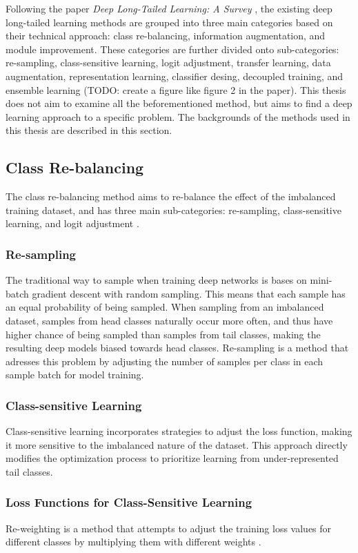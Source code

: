 Following the paper \textit{Deep Long-Tailed Learning: A Survey} \cite{zhang2023deep}, the existing deep long-tailed learning methods are grouped into three main categories based on their technical approach: class re-balancing, information augmentation, and module improvement. These categories are further divided onto sub-categories: re-sampling, class-sensitive learning, logit adjustment, transfer learning, data augmentation, representation learning, classifier desing, decoupled training, and ensemble learning (TODO: create a figure like figure 2 in the paper). This thesis does not aim to examine all the beforementioned method, but aims to find a deep learning approach to a specific problem. The backgrounds of the methods used in this thesis are described in this section.

\subsection{Class Re-balancing}
The class re-balancing method aims to re-balance the effect of the imbalanced training dataset, and has three main sub-categories: re-sampling, class-sensitive learning, and logit adjustment \cite{zhang2023deep}. 

\subsubsection{Re-sampling}
The traditional way to sample when training deep networks is bases on mini-batch gradient descent with random sampling. This means that each sample has an equal probability of being sampled. When sampling from an imbalanced dataset, samples from head classes naturally occur more often, and thus have higher chance of being sampled than samples from tail classes, making the resulting deep models biased towards head classes. Re-sampling is a method that adresses this problem by adjusting the number of samples per class in each sample batch for model training. 

\subsubsection{Class-sensitive Learning}
Class-sensitive learning incorporates strategies to adjust the loss function, making it more sensitive to the imbalanced nature of the dataset. This approach directly modifies the optimization process to prioritize learning from under-represented tail classes.

\subsubsection{Loss Functions for Class-Sensitive Learning}
Re-weighting  is a method that attempts to adjust the training loss values for different classes by multiplying them with different weights \cite{zhang2023deep}.


